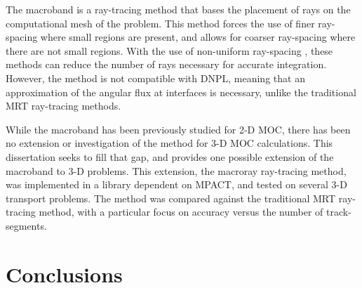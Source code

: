 {{{      The macroband \cite{Villarino1992,Petkov1999,Yamamoto2005,Fevotte2007} is a ray-tracing method that bases the placement of rays on the computational mesh of the problem.
      This method forces the use of finer ray-spacing where small regions are present, and allows for coarser ray-spacing where there are not small regions.
      With the use of non-uniform ray-spacing \cite{Yamamoto2005}, these methods can reduce the number of rays necessary for accurate integration.
      However, the method is not compatible with \acf{DNPL}, meaning that an approximation of the angular flux at interfaces is necessary, unlike the traditional \acf{MRT} ray-tracing methods.

      While the macroband has been previously studied for 2-D \ac{MOC}, there has been no extension or investigation of the method for 3-D \ac{MOC} calculations.
      This dissertation seeks to fill that gap, and provides one possible extension of the macroband to 3-D problems.
      This extension, the macroray ray-tracing method, was implemented in a library dependent on MPACT, and tested on several 3-D transport problems.
      The method was compared against the traditional \ac{MRT} ray-tracing method, with a particular focus on accuracy versus the number of track-segments.
    }
  }

  \section{Conclusions}{\label{sec:Conclusions}
}}

